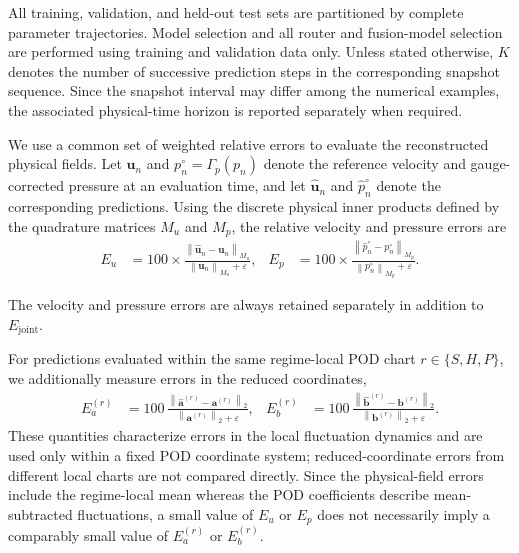 All training, validation, and held-out test sets are partitioned by complete
parameter trajectories. Model selection and all router and fusion-model
selection are performed using training and validation data only. Unless stated
otherwise, $K$ denotes the number of successive prediction steps in the
corresponding snapshot sequence. Since the snapshot interval may differ among
the numerical examples, the associated physical-time horizon is reported
separately when required.

We use a common set of weighted relative errors to evaluate the reconstructed
physical fields. Let $\boldsymbol{u}_n$ and $p_n^\circ=\Gamma_p(p_n)$ denote
the reference velocity and gauge-corrected pressure at an evaluation time, and
let $\widehat{\boldsymbol{u}}_n$ and $\widehat{p}_n^\circ$ denote the
corresponding predictions. Using the discrete physical inner products defined
by the quadrature matrices $M_u$ and $M_p$, the relative velocity and pressure
errors are
\begin{align}
E_u
&=
100\times
\frac{
\left\|
\widehat{\boldsymbol{u}}_n-\boldsymbol{u}_n
\right\|_{M_u}
}{
\left\|
\boldsymbol{u}_n
\right\|_{M_u}+\varepsilon
},
&
E_p
&=
100\times
\frac{
\left\|
\widehat{p}_n^\circ-p_n^\circ
\right\|_{M_p}
}{
\left\|
p_n^\circ
\right\|_{M_p}+\varepsilon
}.
\label{eq:common_field_errors}
\end{align}

The velocity and pressure errors are always retained separately in addition to
$E_{\mathrm{joint}}$.

For predictions evaluated within the same regime-local POD chart
$r\in\{S,H,P\}$, we additionally measure errors in the reduced coordinates,
\begin{align}
E_a^{(r)}
&=
100\,
\frac{
\left\|
\widehat{\boldsymbol{a}}^{(r)}
-\boldsymbol{a}^{(r)}
\right\|_2
}{
\left\|
\boldsymbol{a}^{(r)}
\right\|_2+\varepsilon
},
&
E_b^{(r)}
&=
100\,
\frac{
\left\|
\widehat{\boldsymbol{b}}^{(r)}
-\boldsymbol{b}^{(r)}
\right\|_2
}{
\left\|
\boldsymbol{b}^{(r)}
\right\|_2+\varepsilon
}.
\label{eq:common_coordinate_errors}
\end{align}
These quantities characterize errors in the local fluctuation dynamics and are
used only within a fixed POD coordinate system; reduced-coordinate errors from
different local charts are not compared directly. Since the physical-field
errors include the regime-local mean whereas the POD coefficients describe
mean-subtracted fluctuations, a small value of $E_u$ or $E_p$ does not
necessarily imply a comparably small value of $E_a^{(r)}$ or $E_b^{(r)}$.

